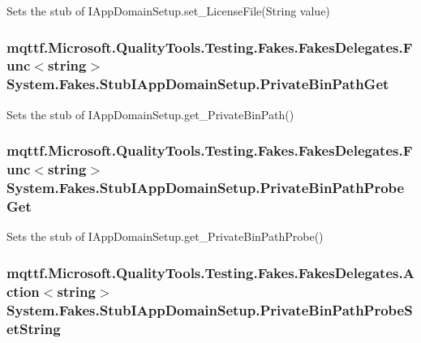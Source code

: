 Sets the stub of I\-App\-Domain\-Setup.\-set\-\_\-\-License\-File(\-String value)

\hypertarget{class_system_1_1_fakes_1_1_stub_i_app_domain_setup_a2651fb7e7582691d09f2840c18e1d14c}{
\subsubsection[{Private\-Bin\-Path\-Get}]{\setlength{\rightskip}{0pt plus 5cm}mqttf.\-Microsoft.\-Quality\-Tools.\-Testing.\-Fakes.\-Fakes\-Delegates.\-Func$<$string$>$ System.\-Fakes.\-Stub\-I\-App\-Domain\-Setup.\-Private\-Bin\-Path\-Get}}\label{class_system_1_1_fakes_1_1_stub_i_app_domain_setup_a2651fb7e7582691d09f2840c18e1d14c}


Sets the stub of I\-App\-Domain\-Setup.\-get\-\_\-\-Private\-Bin\-Path()

\hypertarget{class_system_1_1_fakes_1_1_stub_i_app_domain_setup_a79beaf83c594de66e9837725e0e403fd}{
\subsubsection[{Private\-Bin\-Path\-Probe\-Get}]{\setlength{\rightskip}{0pt plus 5cm}mqttf.\-Microsoft.\-Quality\-Tools.\-Testing.\-Fakes.\-Fakes\-Delegates.\-Func$<$string$>$ System.\-Fakes.\-Stub\-I\-App\-Domain\-Setup.\-Private\-Bin\-Path\-Probe\-Get}}\label{class_system_1_1_fakes_1_1_stub_i_app_domain_setup_a79beaf83c594de66e9837725e0e403fd}


Sets the stub of I\-App\-Domain\-Setup.\-get\-\_\-\-Private\-Bin\-Path\-Probe()

\hypertarget{class_system_1_1_fakes_1_1_stub_i_app_domain_setup_a922ae4f287e106f23f9394e636953884}{
\subsubsection[{Private\-Bin\-Path\-Probe\-Set\-String}]{\setlength{\rightskip}{0pt plus 5cm}mqttf.\-Microsoft.\-Quality\-Tools.\-Testing.\-Fakes.\-Fakes\-Delegates.\-Action$<$string$>$ System.\-Fakes.\-Stub\-I\-App\-Domain\-Setup.\-Private\-Bin\-Path\-Probe\-Set\-String}}\label{class_system_1_1_fakes_1_1_stub_i_app_domain_setup_a922ae4f287e106f23f9394e636953884}


